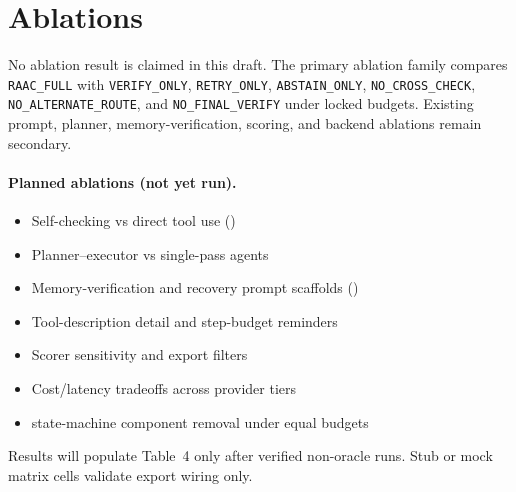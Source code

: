 \section{Ablations}

No ablation result is claimed in this draft. The primary ablation family
compares \texttt{RAAC\_FULL} with \texttt{VERIFY\_ONLY},
\texttt{RETRY\_ONLY}, \texttt{ABSTAIN\_ONLY},
\texttt{NO\_CROSS\_CHECK}, \texttt{NO\_ALTERNATE\_ROUTE}, and
\texttt{NO\_FINAL\_VERIFY} under locked budgets. Existing prompt, planner,
memory-verification, scoring, and backend ablations remain secondary.

\paragraph{Planned ablations (not yet run).}
\begin{itemize}[leftmargin=*]
    \item Self-checking vs direct tool use ()
    \item Planner--executor vs single-pass agents
    \item Memory-verification and recovery prompt scaffolds ()
    \item Tool-description detail and step-budget reminders
    \item Scorer sensitivity and export filters
    \item Cost/latency tradeoffs across provider tiers
    \item \RAAC state-machine component removal under equal budgets
\end{itemize}

Results will populate Table~4 only after verified non-oracle runs. Stub or mock matrix cells validate export wiring only.


